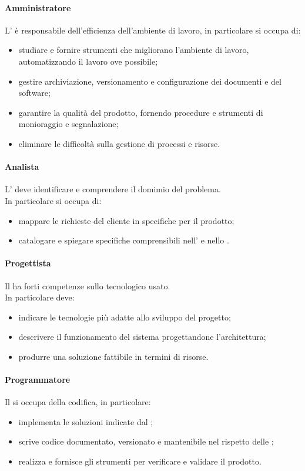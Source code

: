  \paragraph{Amministratore}
 L'\AMM{} è responsabile dell'efficienza dell'ambiente di lavoro, in particolare si occupa di:
 \begin{itemize}
  \item studiare e fornire strumenti che migliorano l'ambiente di lavoro, automatizzando il lavoro ove possibile;
  \item gestire archiviazione, versionamento e configurazione dei documenti e del software;
  \item garantire la qualità del prodotto, fornendo procedure e strumenti di monioraggio e segnalazione;
  \item eliminare le difficoltà sulla gestione di processi e risorse.
 \end{itemize}
 \paragraph{Analista}
 L'\AN{} deve identificare e comprendere il domimio del problema. \\
 In particolare si occupa di:
 \begin{itemize}
  \item mappare le richieste del cliente in specifiche per il prodotto;
  \item catalogare e spiegare specifiche comprensibili nell'\ARdoc{} e nello \SFdoc{}.
 \end{itemize}
 \paragraph{Progettista}
 Il \PJ{} ha forti competenze sullo  tecnologico usato. \\
 In particolare deve: 
 \begin{itemize}
  \item indicare le tecnologie più adatte allo sviluppo del progetto;
  \item descrivere il funzionamento del sistema progettandone l'architettura;
  \item produrre una soluzione fattibile in termini di risorse.
 \end{itemize}
 \paragraph{Programmatore}
 Il \PR{} si occupa della codifica, in particolare:
 \begin{itemize}
  \item implementa le soluzioni indicate dal \PJ ;
  \item scrive codice documentato, versionato e mantenibile nel rispetto delle \NPdoc ;
  \item realizza e fornisce gli strumenti per verificare e validare il prodotto.
 \end{itemize}
